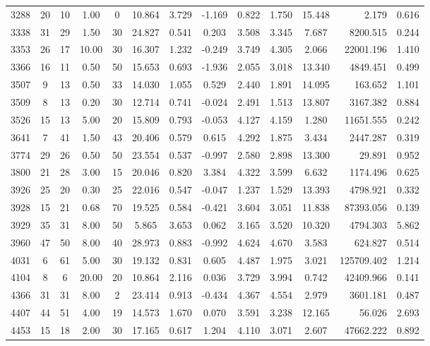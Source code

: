\documentclass[mnsc]{informs3}
\begin{document}
\begin{APPENDICES}
\begin{longtable}{cccccccccccrc}
3288 & 20 & 10 & 1.00 & 0 & 10.864 & 3.729 & -1.169 & 0.822 & 1.750 & 15.448 & 2.179 & 0.616 \\
3338 & 31 & 29 & 1.50 & 30 & 24.827 & 0.541 & 0.203 & 3.508 & 3.345 & 7.687 & 8200.515 & 0.244 \\
3353 & 26 & 17 & 10.00 & 30 & 16.307 & 1.232 & -0.249 & 3.749 & 4.305 & 2.066 & 22001.196 & 1.410 \\
3366 & 16 & 11 & 0.50 & 50 & 15.653 & 0.693 & -1.936 & 2.055 & 3.018 & 13.340 & 4849.451 & 0.499 \\
3507 & 9 & 13 & 0.50 & 33 & 14.030 & 1.055 & 0.529 & 2.440 & 1.891 & 14.095 & 163.652 & 1.101 \\
3509 & 8 & 13 & 0.20 & 30 & 12.714 & 0.741 & -0.024 & 2.491 & 1.513 & 13.807 & 3167.382 & 0.884 \\
3526 & 15 & 13 & 5.00 & 20 & 15.809 & 0.793 & -0.053 & 4.127 & 4.159 & 1.280 & 11651.555 & 0.242 \\
3641 & 7 & 41 & 1.50 & 43 & 20.406 & 0.579 & 0.615 & 4.292 & 1.875 & 3.434 & 2447.287 & 0.319 \\
3774 & 29 & 26 & 0.50 & 50 & 23.554 & 0.537 & -0.997 & 2.580 & 2.898 & 13.300 & 29.891 & 0.952 \\
3800 & 21 & 28 & 3.00 & 15 & 20.046 & 0.820 & 3.384 & 4.322 & 3.599 & 6.632 & 1174.496 & 0.625 \\
3926 & 25 & 20 & 0.30 & 25 & 22.016 & 0.547 & -0.047 & 1.237 & 1.529 & 13.393 & 4798.921 & 0.332 \\
3928 & 15 & 21 & 0.68 & 70 & 19.525 & 0.584 & -0.421 & 3.604 & 3.051 & 11.838 & 87393.056 & 0.139 \\
3929 & 35 & 31 & 8.00 & 50 & 5.865 & 3.653 & 0.062 & 3.165 & 3.520 & 10.320 & 4794.303 & 5.862 \\
3960 & 47 & 50 & 8.00 & 40 & 28.973 & 0.883 & -0.992 & 4.624 & 4.670 & 3.583 & 624.827 & 0.514 \\
4031 & 6 & 61 & 5.00 & 30 & 19.132 & 0.831 & 0.605 & 4.487 & 1.975 & 3.021 & 125709.402 & 1.214 \\
4104 & 8 & 6 & 20.00 & 20 & 10.864 & 2.116 & 0.036 & 3.729 & 3.994 & 0.742 & 42409.966 & 0.141 \\
4366 & 31 & 31 & 8.00 & 2 & 23.414 & 0.913 & -0.434 & 4.367 & 4.554 & 2.979 & 3601.181 & 0.487 \\
4407 & 44 & 51 & 4.00 & 19 & 14.573 & 1.670 & 0.070 & 3.591 & 3.238 & 12.165 & 56.026 & 2.693 \\
4453 & 15 & 18 & 2.00 & 30 & 17.165 & 0.617 & 1.204 & 4.110 & 3.071 & 2.607 & 47662.222 & 0.892 \\

\end{longtable}
\end{APPENDICES}
\end{document}
